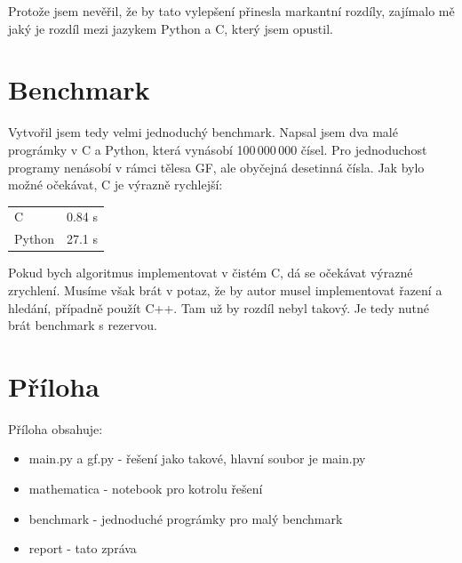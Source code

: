 \documentclass[czech,a4paper,11pt]{article}
\begin{document}
Protože jsem nevěřil, že by tato vylepšení přinesla markantní rozdíly, zajímalo mě jaký je rozdíl mezi jazykem Python a C, který jsem opustil.

\section{Benchmark}

Vytvořil jsem tedy velmi jednoduchý benchmark. Napsal jsem dva malé prográmky v C a Python, která vynásobí 100\,000\,000 čísel. Pro jednoduchost programy nenásobí v rámci tělesa GF, ale obyčejná desetinná čísla. Jak bylo možné očekávat, C je výrazně rychlejší:

\begin{table}[h]
	\centering
    \begin{tabular}{ll}
    C      & 0.84 s \\
    Python & 27.1 s \\
    \end{tabular}
\end{table}


Pokud bych algoritmus implementovat v čistém C, dá se očekávat výrazné zrychlení. Musíme však brát v potaz, že by autor musel implementovat řazení a hledání, případně použít C++. Tam už by rozdíl nebyl takový. Je tedy nutné brát benchmark s rezervou.


\section{Příloha}

Příloha obsahuje:

\begin{itemize}
	\item main.py a gf.py - řešení jako takové, hlavní soubor je main.py
	\item mathematica - notebook pro kotrolu řešení
	\item benchmark - jednoduché prográmky pro malý benchmark
	\item report - tato zpráva
\end{itemize}
\end{document}
